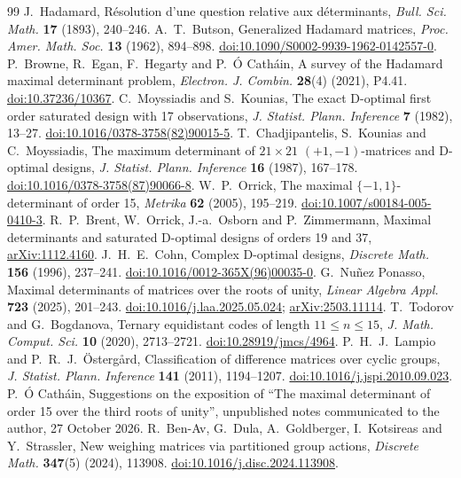 \begin{thebibliography}{99}
 J.~Hadamard, R\'esolution d'une question relative aux d\'eterminants, \emph{Bull. Sci. Math.} \textbf{17} (1893), 240--246.
 A.~T.~Butson, Generalized Hadamard matrices, \emph{Proc. Amer. Math. Soc.} \textbf{13} (1962), 894--898. \href{https://doi.org/10.1090/S0002-9939-1962-0142557-0}{doi:10.1090/S0002-9939-1962-0142557-0}.
 P.~Browne, R.~Egan, F.~Hegarty and P.~\'O Cath\'ain, A survey of the Hadamard maximal determinant problem, \emph{Electron. J. Combin.} \textbf{28}(4) (2021), P4.41. \href{https://doi.org/10.37236/10367}{doi:10.37236/10367}.
 C.~Moyssiadis and S.~Kounias, The exact D-optimal first order saturated design with 17 observations, \emph{J. Statist. Plann. Inference} \textbf{7} (1982), 13--27. \href{https://doi.org/10.1016/0378-3758(82)90015-5}{doi:10.1016/0378-3758(82)90015-5}.
 T.~Chadjipantelis, S.~Kounias and C.~Moyssiadis, The maximum determinant of $21\times21$ $(+1,-1)$-matrices and D-optimal designs, \emph{J. Statist. Plann. Inference} \textbf{16} (1987), 167--178. \href{https://doi.org/10.1016/0378-3758(87)90066-8}{doi:10.1016/0378-3758(87)90066-8}.
 W.~P.~Orrick, The maximal $\{-1,1\}$-determinant of order 15, \emph{Metrika} \textbf{62} (2005), 195--219. \href{https://doi.org/10.1007/s00184-005-0410-3}{doi:10.1007/s00184-005-0410-3}.
 R.~P.~Brent, W.~Orrick, J.-a.~Osborn and P.~Zimmermann, Maximal determinants and saturated D-optimal designs of orders 19 and 37, \href{https://arxiv.org/abs/1112.4160}{arXiv:1112.4160}.
 J.~H.~E.~Cohn, Complex D-optimal designs, \emph{Discrete Math.} \textbf{156} (1996), 237--241. \href{https://doi.org/10.1016/0012-365X(96)00035-0}{doi:10.1016/0012-365X(96)00035-0}.
 G.~Nu\~nez Ponasso, Maximal determinants of matrices over the roots of unity, \emph{Linear Algebra Appl.} \textbf{723} (2025), 201--243. \href{https://doi.org/10.1016/j.laa.2025.05.024}{doi:10.1016/j.laa.2025.05.024}; \href{https://arxiv.org/abs/2503.11114}{arXiv:2503.11114}.
 T.~Todorov and G.~Bogdanova, Ternary equidistant codes of length $11\le n\le15$, \emph{J. Math. Comput. Sci.} \textbf{10} (2020), 2713--2721. \href{https://doi.org/10.28919/jmcs/4964}{doi:10.28919/jmcs/4964}.
 P.~H.~J.~Lampio and P.~R.~J.~\"Osterg\aa rd, Classification of difference matrices over cyclic groups, \emph{J. Statist. Plann. Inference} \textbf{141} (2011), 1194--1207. \href{https://doi.org/10.1016/j.jspi.2010.09.023}{doi:10.1016/j.jspi.2010.09.023}.
 P.~\'O Cath\'ain, Suggestions on the exposition of ``The maximal determinant of order 15 over the third roots of unity'', unpublished notes communicated to the author, 27 October 2026.
 R.~Ben-Av, G.~Dula, A.~Goldberger, I.~Kotsireas and Y.~Strassler, New weighing matrices via partitioned group actions, \emph{Discrete Math.} \textbf{347}(5) (2024), 113908. \href{https://doi.org/10.1016/j.disc.2024.113908}{doi:10.1016/j.disc.2024.113908}.
\end{thebibliography}
